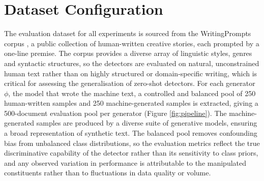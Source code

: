 \documentclass[logo,msc,cs]{infthesis}      %
\begin{document}
\section{Dataset Configuration}
\label{sec:dataset}
The evaluation dataset for all experiments is sourced from the WritingPrompts corpus \citep{fan2018hierarchical}, a public collection of human-written creative stories, each prompted by a one-line premise. The corpus provides a diverse array of linguistic styles, genres and syntactic structures, so the detectors are evaluated on natural, unconstrained human text rather than on highly structured or domain-specific writing, which is critical for assessing the generalisation of zero-shot detectors.
For each generator $\phi$, the model that wrote the machine text, a controlled and balanced pool of 250 human-written samples and 250 machine-generated samples is extracted, giving a 500-document evaluation pool per generator (Figure \ref{fig:pipeline}). The machine-generated samples are produced by a diverse suite of generative models, ensuring a broad representation of synthetic text. The balanced pool removes confounding bias from unbalanced class distributions, so the evaluation metrics reflect the true discriminative capability of the detector rather than its sensitivity to class priors, and any observed variation in performance is attributable to the manipulated constituents rather than to fluctuations in data quality or volume.
\end{document}
